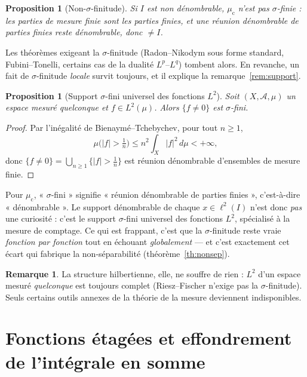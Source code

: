 \documentclass[11pt,a4paper]{article}
\theoremstyle{plain}
\newtheorem{proposition}[theoreme]{Proposition}
\theoremstyle{definition}
\newtheorem{remarque}[theoreme]{Remarque}
\newcommand{\abs}[1]{\left\lvert #1 \right\rvert}
\newcommand{\muc}{\mu_{\mathrm{c}}}
\begin{document}
\begin{proposition}[Non-$\sigma$-finitude]
Si $I$ est non dénombrable, $\muc$ n'est pas $\sigma$-finie : les parties de
mesure finie sont les parties finies, et une réunion dénombrable de parties
finies reste dénombrable, donc $\neq I$.
\end{proposition}

Les théorèmes exigeant la $\sigma$-finitude (Radon--Nikodym sous forme standard,
Fubini--Tonelli, certains cas de la dualité $L^p$--$L^q$) tombent alors. En
revanche, un fait de $\sigma$-finitude \emph{locale} survit toujours, et il
explique la remarque~\ref{rem:support}.

\begin{proposition}[Support $\sigma$-fini universel des fonctions $L^2$]
Soit $(X,\mathscr{A},\mu)$ un espace mesuré \emph{quelconque} et $f \in L^2(\mu)$.
Alors $\{f \neq 0\}$ est $\sigma$-fini.
\end{proposition}

\begin{proof}
Par l'inégalité de Bienaymé--Tchebychev, pour tout $n \ge 1$,
\[
  \mu\bigl(\abs{f} > \tfrac1n\bigr)
   \le n^2 \int_X \abs{f}^2 \, d\mu < +\infty,
\]
donc $\{f \neq 0\} = \bigcup_{n\ge1} \{\abs{f} > \tfrac1n\}$ est réunion
dénombrable d'ensembles de mesure finie.
\end{proof}

Pour $\muc$, « $\sigma$-fini » signifie « réunion dénombrable de parties finies »,
c'est-à-dire « dénombrable ». Le support dénombrable de chaque $x \in \ell^2(I)$
n'est donc \emph{pas} une curiosité : c'est le support $\sigma$-fini universel des
fonctions $L^2$, spécialisé à la mesure de comptage. Ce qui est frappant, c'est
que la $\sigma$-finitude reste vraie \emph{fonction par fonction} tout en
échouant \emph{globalement} — et c'est exactement cet écart qui fabrique la
non-séparabilité (théorème~\ref{th:nonsep}).

\begin{remarque}
La structure hilbertienne, elle, ne souffre de rien : $L^2$ d'un espace mesuré
\emph{quelconque} est toujours complet (Riesz--Fischer n'exige pas la
$\sigma$-finitude). Seuls certains outils annexes de la théorie de la mesure
deviennent indisponibles.
\end{remarque}

\section{Fonctions étagées et effondrement de l'intégrale en somme}
\label{sec:etagees}
\end{document}

